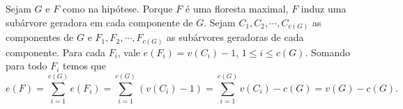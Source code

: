 Sejam $G$ e $F$ como na hipótese. Porque $F$ é uma floresta maximal, $F$ induz
uma subárvore geradora em cada componente de $G$. Sejam $C_1,C_2,\cdots,C_{c(G)}$
as componentes de $G$ e $F_1,F_2,\cdots,F_{c(G)}$ as subárvores geradoras de cada
componente. Para cada $F_i$, vale $e(F_i) = v(C_i) - 1$, $1 \le i \le c(G)$.
Somando para todo $F_i$ temos que
\[
    e(F) = \sum^{c(G)}_{i=1} e(F_i) = \sum^{c(G)}_{i=1} (v(C_i) - 1) = \sum^{c(G)}_{i=1} v(C_i) - c(G) = v(G) - c(G).
\]
\fimprova

